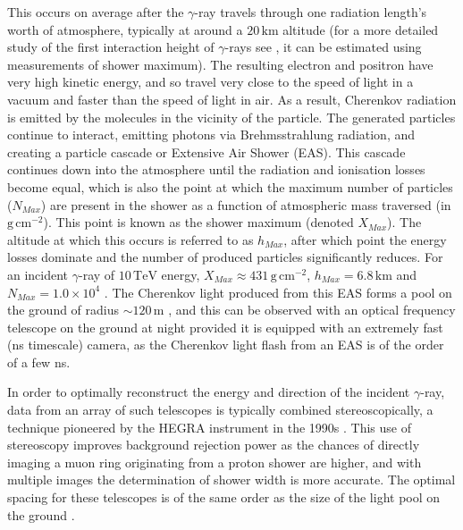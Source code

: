 This occurs on average after the $\gamma$-ray travels through one radiation length's worth of atmosphere, typically at around a $\mathrm{20\,km}$ altitude \cite{weekesgamma} (for a more detailed study of the first interaction height of $\gamma$-rays see \cite{Sitarek1i}, it can be estimated using measurements of shower maximum). The resulting electron and positron have very high kinetic energy, and so travel very close to the speed of light in a vacuum and faster than the speed of light in air. As a result, Cherenkov radiation is emitted by the molecules in the vicinity of the particle. The generated particles continue to interact, emitting photons via Brehmsstrahlung radiation, and creating a particle cascade or Extensive Air Shower (EAS). This cascade continues down into the atmosphere until the radiation and ionisation losses become equal, which is also the point at which the maximum number of particles ($N_{Max}$) are present in the shower as a function of atmospheric mass traversed (in $\mathrm{g\,cm^{-2}}$). This point is known as the shower maximum (denoted $X_{Max}$). The altitude at which this occurs is referred to as $h_{Max}$, after which point the energy losses dominate and the number of produced particles significantly reduces. For an incident $\gamma$-ray of $\mathrm{10\,TeV}$ energy, $X_{Max}\approx \mathrm{431\,g\,cm^{-2}}$, $h_{Max}=\mathrm{6.8\,km}$ and $N_{Max}=\mathrm{1.0 \times 10^4}$ \cite{weekesgamma}.  The Cherenkov light produced from this EAS forms a pool on the ground of radius $\sim\mathrm{120\,m}$ \cite{weekesgamma}, and this can be observed with an optical frequency telescope on the ground at night provided it is equipped with an extremely fast (ns timescale) camera, as the Cherenkov light flash from an 
EAS is of the order of a few ns. 

In order to optimally reconstruct the energy and direction of the incident $\gamma$-ray, data from an array of such telescopes is typically combined stereoscopically, a technique pioneered by the HEGRA instrument in the 1990s \cite{HEGRA}. This use of stereoscopy improves background rejection power as the chances of directly imaging a muon ring originating from a proton shower are higher, and with multiple images the determination of shower width is more accurate.  The optimal spacing for these telescopes is of the same order as the size of the light pool on the ground \cite{weekesgamma}.

